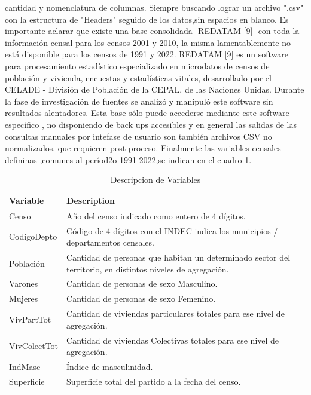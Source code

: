\documentclass{article}
\theoremstyle{mytheoremstyle}
\theoremstyle{mytheoremstyle}
\theoremstyle{myproblemstyle}
\begin{document}
 cantidad y nomenclatura de columnas.
Siempre buscando lograr un archivo ".csv" con la estructura de "Headers"  seguido de los datos,sin espacios en blanco.\newline
Es importante aclarar que existe una base consolidada -REDATAM [9]- con toda la información censal para los censos 2001 y 2010,
 la misma lamentablemente no está disponible para los censos de 1991 y 2022. 
 REDATAM [9] es un software para procesamiento estadístico especializado en microdatos de
  censos de población y vivienda, encuestas y estadísticas vitales,
  desarrollado por el CELADE  -  División de Población de la CEPAL, de las Naciones Unidas.
Durante la fase de investigación de fuentes se analizó y manipuló este software sin resultados alentadores. Esta base sólo puede accederse mediante este software específico
, no disponiendo de back ups accesibles y en general las salidas de las consultas manuales por intefase de usuario son también archivos CSV no normalizados.
que requieren post-proceso.\newline
 Finalmente las variables censales defininas ,comunes al  períod2o 1991-2022,se indican en el cuadro  \ref{variables}.
 

 \begin{table}[htbp]
     \centering
     \caption{Descripcion de Variables}
     \begin{tabular}{|l|p{8cm}|}
         \hline
         \textbf{Variable} & \textbf{Description} \\
         \hline
         Censo & Año del censo indicado como entero de 4 dígitos. \\
         CodigoDepto & Código de 4 dígitos con el INDEC indica los municipios / departamentos censales. \\
         Población & Cantidad de personas que habitan un determinado sector del territorio, en distintos niveles de agregación. \\
         Varones & Cantidad de personas de sexo Masculino. \\
         Mujeres & Cantidad de personas de sexo Femenino. \\
         VivPartTot & Cantidad de viviendas particulares totales para ese nivel de agregación. \\
         VivColectTot & Cantidad de viviendas Colectivas totales para ese nivel de agregación. \\
         IndMasc & Índice de masculinidad. \\
         Superficie & Superficie total del partido a la fecha del censo. \\
         \hline
     \end{tabular}
     \label{variables}
 \end{table}
\end{document}
